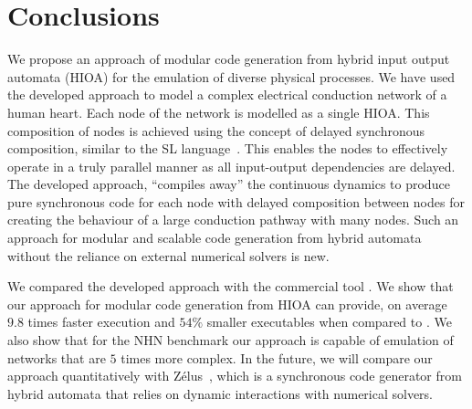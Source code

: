 \section{Conclusions}

We propose an approach of modular code generation 
from hybrid input output automata (HIOA)
for the emulation of diverse physical processes. 
We have used the developed approach to model 
 a complex electrical conduction network of a human heart.
Each node of the network is modelled as a single HIOA.
This composition of nodes is achieved using the concept of 
delayed synchronous composition, similar to the SL 
language~\cite{SlLanguage}. 
This enables the nodes to effectively operate 
in a truly parallel manner as all
input-output dependencies are delayed. 
The developed approach,  ``compiles away'' the continuous dynamics to
produce pure synchronous code for each node with delayed composition between nodes for creating the behaviour of a large conduction 
pathway with many nodes. Such an approach for modular and scalable code generation from hybrid automata without the reliance on external numerical solvers is new.

We compared the developed approach with the commercial tool \simulink. We show that our approach for modular code generation from \ac{HIOA} can 
provide, on average $9.8$ times faster execution and $54\%$ smaller executables 
when compared to \simulink.
We also show that for the \acf{NHN} benchmark our approach is capable of 
emulation of networks that are $5$ times more complex. 
In the future, we will compare our approach quantitatively with Z\'{e}lus~\cite{bourke13zelus},
 which is a synchronous code generator from hybrid automata that relies on dynamic interactions with numerical solvers.


